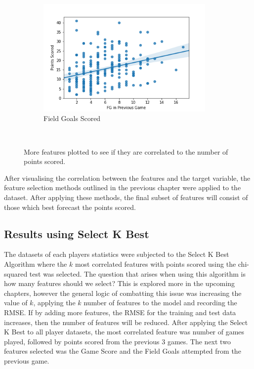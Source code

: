 \documentclass[a4paper,11pt,twoside]{article}
\begin{document}
\begin{figure} [h!]
{\begin{subfigure}[b]{.45\textwidth}
\centering
\includegraphics[width=0.95\textwidth]{../fgoals_pts.png}
\caption{Field Goals Scored}
\end{subfigure}%
}\\
\caption{More features plotted to see if they are correlated to  the number of points scored.}
\end{figure}



After visualising the correlation between the features and the target variable, the feature selection methods outlined in the previous chapter were applied to the dataset. After applying these methods, the final subset of features will consist of those which best forecast the points scored.

\subsection{Results using Select K Best}

The datasets of each players statistics were subjected to the Select K Best Algorithm where the $k$ most correlated features with points scored using the chi-squared test was selected. The question that arises when using this algorithm is how many features should we select? This is explored more in the upcoming chapters, however the general logic of combatting this issue was increasing the value of $k$, applying the $k$ number of features to the model and recording the RMSE. If by adding more features, the RMSE for the training and test data increases, then the number of features will be reduced. After applying the Select K Best to all player datasets, the most correlated feature was number of games played, followed by points scored from the previous 3 games. The next two features selected was the Game Score and the Field Goals attempted from the previous game.
\end{document}
